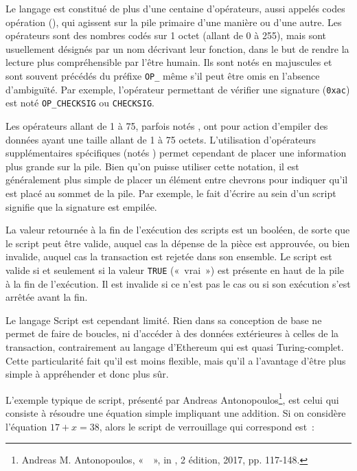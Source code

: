 Le langage est constitué de plus d'une centaine d'opérateurs, aussi appelés codes opération (), qui agissent sur la pile primaire d'une manière ou d'une autre. Les opérateurs sont des nombres codés sur 1 octet (allant de 0 à 255), mais sont usuellement désignés par un nom décrivant leur fonction, dans le but de rendre la lecture plus compréhensible par l'être humain. Ils sont notés en majuscules et sont souvent précédés du préfixe \texttt{OP\_} même s'il peut être omis en l'absence d'ambiguïté. Par exemple, l'opérateur permettant de vérifier une signature (\texttt{0xac}) est noté \texttt{OP\_CHECKSIG} ou \texttt{CHECKSIG}.

Les opérateurs allant de 1 à 75, parfois notés , ont pour action d'empiler des données ayant une taille allant de 1 à 75 octets. L'utilisation d'opérateurs supplémentaires spécifiques (notés ) permet cependant de placer une information plus grande sur la pile. Bien qu'on puisse utiliser cette notation, il est généralement plus simple de placer un élément entre chevrons pour indiquer qu'il est placé au sommet de la pile. Par exemple, le fait d'écrire  au sein d'un script signifie que la signature est empilée.

La valeur retournée à la fin de l'exécution des scripts est un booléen, de sorte que le script peut être valide, auquel cas la dépense de la pièce est approuvée, ou bien invalide, auquel cas la transaction est rejetée dans son ensemble. Le script est valide si et seulement si la valeur \texttt{TRUE} («~vrai~») est présente en haut de la pile à la fin de l'exécution. Il est invalide si ce n'est pas le cas ou si son exécution s'est arrêtée avant la fin.

Le langage Script est cependant limité. Rien dans sa conception de base ne permet de faire de boucles, ni d'accéder à des données extérieures à celles de la transaction, contrairement au langage d'Ethereum qui est quasi Turing-complet. Cette particularité fait qu'il est moins flexible, mais qu'il a l'avantage d'être plus simple à appréhender et donc plus sûr.

L'exemple typique de script, présenté par Andreas Antonopoulos\footnote{Andreas M. Antonopoulos, «~~», in , 2\ieme{} édition, 2017, pp. 117-148.}, est celui qui consiste à résoudre une équation simple impliquant une addition. Si on considère l'équation $17 + x = 38$, alors le script de verrouillage qui correspond est~:

